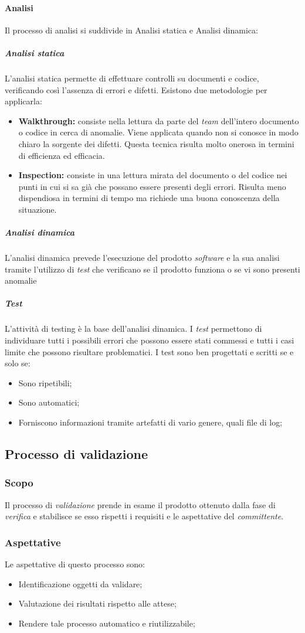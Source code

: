 				\paragraph{Analisi}
				\aCapo{}  
					Il processo di analisi si suddivide in Analisi statica e Analisi dinamica:
						\subparagraph{Analisi statica}
						\aCapo{}  
							L'analisi statica permette di effettuare controlli su documenti e codice, verificando così l'assenza di errori e difetti. Esistono due metodologie per applicarla:
								\begin{itemize}
									\item \textbf{Walkthrough:} consiste nella lettura da parte del \emph{team} dell'intero documento o codice in cerca di anomalie. Viene applicata quando non si conosce in modo chiaro la sorgente dei difetti. Questa tecnica risulta molto onerosa in termini di efficienza ed efficacia.
									\item \textbf{Inspection:} consiste in una lettura mirata del documento o del codice nei punti in cui si sa già che possano essere presenti degli errori. Risulta meno dispendiosa in termini di tempo ma richiede una buona conoscenza della situazione.
								\end{itemize}
						\subparagraph{Analisi dinamica}
						\aCapo{}  
							L'analisi dinamica prevede l'esecuzione del prodotto \emph{software} e la sua analisi tramite l'utilizzo di \emph{test} che verificano se il prodotto funziona o se vi sono presenti anomalie
						\subparagraph{Test}
						\aCapo{}  
							L'attività di testing è la base dell'analisi dinamica. I \emph{test} permettono di individuare tutti i possibili errori che possono essere stati commessi e tutti i casi limite che possono risultare problematici. \newline
							I test sono ben progettati e scritti se e solo se:
								\begin{itemize}
									\item Sono ripetibili;
									\item Sono automatici;
									\item Forniscono informazioni tramite artefatti di vario genere, quali file di log;
								\end{itemize}
		
		\subsection{Processo di validazione} %
			\subsubsection{Scopo}
				Il processo di \emph{validazione} prende in esame il prodotto ottenuto dalla fase di \emph{verifica} e stabilisce se esso rispetti i requisiti e le aspettative del \emph{committente}.
			\subsubsection{Aspettative}
				Le aspettative di questo processo sono:
					\begin{itemize}
						\item Identificazione oggetti da validare;
						\item Valutazione dei risultati rispetto alle attese;
						\item Rendere tale processo automatico e riutilizzabile;
					\end{itemize}
